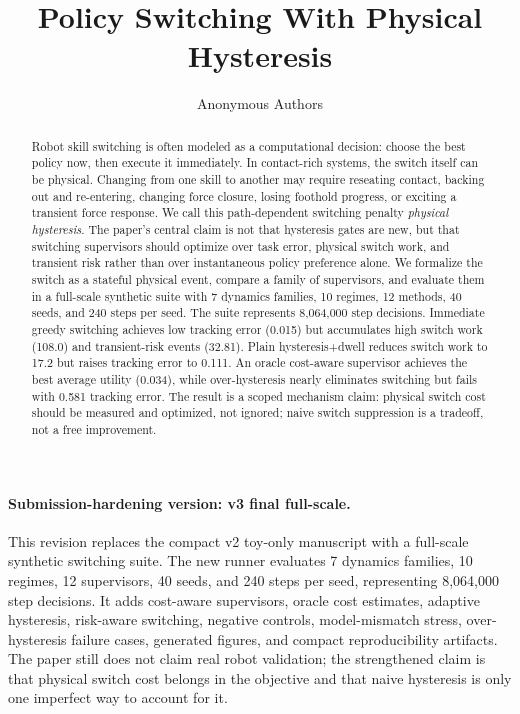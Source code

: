 \documentclass{article}
\title{Policy Switching With Physical Hysteresis}
\author{Anonymous Authors}
\date{}
\begin{document}
\maketitle

\paragraph{Submission-hardening version: v3 final full-scale.}
This revision replaces the compact v2 toy-only manuscript with a full-scale synthetic switching suite. The new runner evaluates 7 dynamics families, 10 regimes, 12 supervisors, 40 seeds, and 240 steps per seed, representing 8,064,000 step decisions. It adds cost-aware supervisors, oracle cost estimates, adaptive hysteresis, risk-aware switching, negative controls, model-mismatch stress, over-hysteresis failure cases, generated figures, and compact reproducibility artifacts. The paper still does not claim real robot validation; the strengthened claim is that physical switch cost belongs in the objective and that naive hysteresis is only one imperfect way to account for it.

\begin{abstract}
Robot skill switching is often modeled as a computational decision: choose the best policy now, then execute it immediately.
In contact-rich systems, the switch itself can be physical.
Changing from one skill to another may require reseating contact, backing out and re-entering, changing force closure, losing foothold progress, or exciting a transient force response.
We call this path-dependent switching penalty \emph{physical hysteresis}.
The paper's central claim is not that hysteresis gates are new, but that switching supervisors should optimize over task error, physical switch work, and transient risk rather than over instantaneous policy preference alone.
We formalize the switch as a stateful physical event, compare a family of supervisors, and evaluate them in a full-scale synthetic suite with 7 dynamics families, 10 regimes, 12 methods, 40 seeds, and 240 steps per seed.
The suite represents 8,064,000 step decisions.
Immediate greedy switching achieves low tracking error (0.015) but accumulates high switch work (108.0) and transient-risk events (32.81).
Plain hysteresis+dwell reduces switch work to 17.2 but raises tracking error to 0.111.
An oracle cost-aware supervisor achieves the best average utility (0.034), while over-hysteresis nearly eliminates switching but fails with 0.581 tracking error.
The result is a scoped mechanism claim: physical switch cost should be measured and optimized, not ignored; naive switch suppression is a tradeoff, not a free improvement.
\end{abstract}
\end{document}
